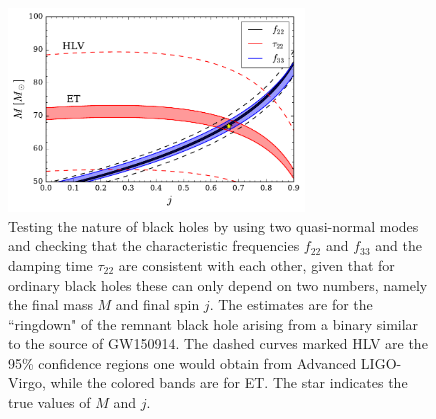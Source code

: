 \begin{figure}[t]
\centering
\includegraphics[width=0.7\textwidth]{Figures/3g_ringdown.pdf}
\caption{\small Testing the nature of black holes by using two quasi-normal modes and checking
that the characteristic frequencies $f_{22}$ and $f_{33}$ and the damping time $\tau_{22}$ are consistent
with each other, given that for ordinary black holes these can only depend on two numbers, namely
the final mass $M$ and final spin $j$. The estimates are for the ``ringdown" of the remnant
black hole arising from a binary similar to the source of GW150914. The dashed curves marked HLV 
are the 95\% confidence regions one would obtain from Advanced LIGO-Virgo, while the colored bands
are for ET. The star indicates the true values of $M$ and $j$.
}
\label{fig:ringdown}
\end{figure} 

